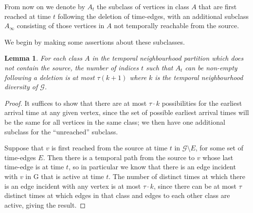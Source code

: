 \documentclass[preprint,12pt]{elsarticle}
\newtheorem{lemma}{Lemma}
\begin{document}
From now on we denote by $A_t$ the subclass of vertices in class $A$ that are first reached at time $t$ following the deletion of time-edges, with an additional subclass $A_{\infty}$ consisting of those vertices in $A$ not temporally reachable from the source.

We begin by making some assertions about these subclasses. 


\begin{lemma}\label{cor:iqp-number-subclasses}
    For each class $A$ in the temporal neighbourhood partition which does not contain the source, the number of indices $t$ such that $A_t$ can be non-empty following a deletion is at most $\tau (k+1)$ where $k$ is the temporal neighbourhood diversity of $\mathcal{G}$.
\end{lemma}
\begin{proof}
    It suffices to show that there are at most $\tau \cdot k$ possibilities for the earliest arrival time at any given vertex, since the set of possible earliest arrival times will be the same for all vertices in the same class; we then have one additional subclass for the ``unreached'' subclass.

    Suppose that $v$ is first reached from the source at time $t$ in $\mathcal{G}\setminus E$, for some set of time-edges $E$. Then there is a temporal path from the source to $v$ whose last time-edge is at time $t$, so in particular we know that there is an edge incident with $v$ in G that is active at time $t$.  The number of distinct times at which there is an edge incident with any vertex is at most $\tau\cdot k$, since there can be at most $\tau$ distinct times at which edges in that class and edges to each other class are active, giving the result.
\end{proof}
\end{document}
